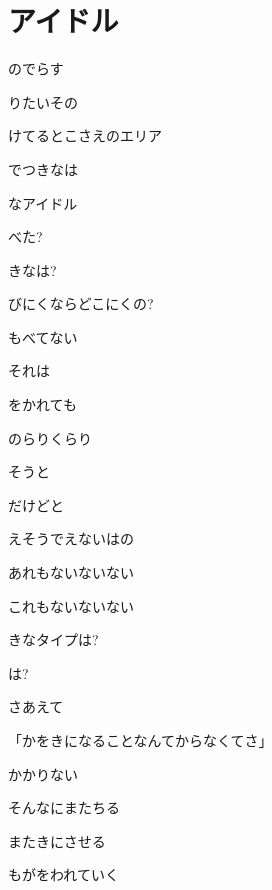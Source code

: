 \section{アイドル}

のでらす

りたいその

けてるとこさえのエリア

でつきなは

なアイドル

\bigskip

べた?

きなは?

びにくならどこにくの?

もべてない

それは

をかれても

のらりくらり

\bigskip

そうと

だけどと

えそうでえないはの

あれもないないない

これもないないない

きなタイプは?

は?

さあえて

\bigskip

「かをきになることなんてからなくてさ」

かかりない

そんなにまたちる

またきにさせる

\bigskip

もがをわれていく

